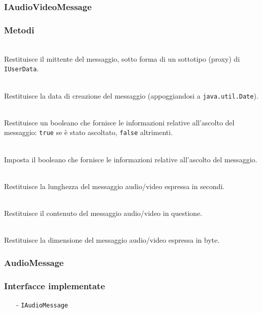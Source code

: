 \subsubsection{IAudioVideoMessage}\label{sec:iaudiovideomessage}
\subsubsection*{Metodi}
\begin{description}
  \item{}\\
Restituisce il mittente del messaggio, sotto forma di un sottotipo (proxy) di \texttt{IUserData}.
  \item{}\\
Restituisce la data di creazione del messaggio (appoggiandosi a \texttt{java.util.Date}).
  \item{}\\
Restituisce un booleano che fornisce le informazioni relative all'ascolto del messaggio: \texttt{true} se è stato ascoltato, \texttt{false} altrimenti.
  \item{}\\
Imposta il booleano che fornisce le informazioni relative all'ascolto del messaggio.
  \item{}\\
Restituisce la lunghezza del messaggio audio/video espressa in secondi.
  \item{}\\
Restituisce il contenuto del messaggio audio/video in questione.
  \item{}\\
Restituisce la dimensione del messaggio audio/video espressa in byte.
\end{description}

\subsubsection{AudioMessage}\label{sec:audiomessage}

\subsubsection*{Interfacce implementate}
\begin{itemize}[noitemsep,nolistsep]
  \item[-]\texttt{IAudioMessage}
\end{itemize}

